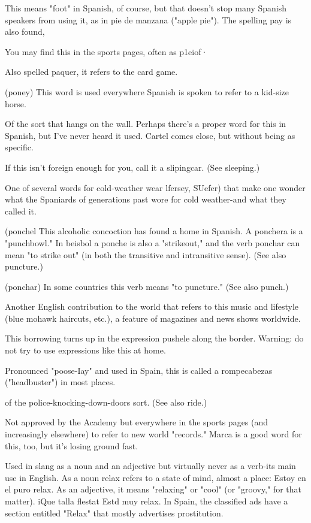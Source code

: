  This means "foot" in Spanish, of course, but that doesn't
stop many Spanish speakers from using it, as in pie de manzana
("apple pie"). The spelling pay is also found,

 You may find this in the sports pages, often as
p1eiof·

 Also spelled paquer, it refers to the card game.

 (poney) This word is used everywhere Spanish is spoken to refer to a kid-size horse.

 Of the sort that hangs on the wall. Perhaps there's a
proper word for this in Spanish, but I've never heard it used. Cartel
comes close, but without being as specific.

 If this isn't foreign enough for you, call it a slipingcar. (See sleeping.)

 One of several words for cold-weather wear lfersey, SUefer) that make one wonder what the Spaniards of generations
past wore for cold weather-and what they called it.

 (ponchel This alcoholic concoction has found a home
in Spanish. A ponchera is a "punchbowl." In beisbol a ponche is also
a "strikeout," and the verb ponchar can mean "to strike out" (in both
the transitive and intransitive sense). (See also puncture.)

 (ponchar) In some countries this verb means "to
puncture." (See also punch.)

 Another English contribution to the world that refers
to this music and lifestyle (blue mohawk haircuts, etc.), a feature of
magazines and news shows worldwide.

 This borrowing turns up in the expression pushele
along the border. Warning: do not try to use expressions like this
at home.

 Pronounced "poose-Iay" and used in Spain, this is
called a rompecabezas ("headbuster") in most places.

 of the police-knocking-down-doors sort. (See also ride.)

 Not approved by the Academy but everywhere in
the sports pages (and increasingly elsewhere) to refer to new world "records." Marca is a good word for this, too, but it's losing ground fast.

 Used in slang as a noun and an adjective but virtually
never as a verb-its main use in English. As a noun relax refers to a
state of mind, almost a place: Estoy en el puro relax. As an adjective, it
means "relaxing" or "cool" (or "groovy," for that matter). iQue talla
flestat Estd muy relax. In Spain, the classified ads have a section entitled "Relax" that mostly advertises prostitution.

